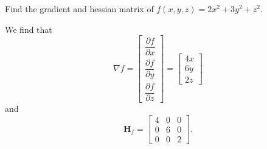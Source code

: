 \begin{example}
    Find the gradient and hessian matrix of $f(x,y,z) = 2x^2+3y^2+z^2$.
\end{example}
\begin{soln}
    We find that $$\nabla f = \begin{bmatrix} \dfrac{\partial f}{\partial x} \\[2.2ex] {\dfrac{\partial f}{\partial y}} \\[2.2ex]{\dfrac{\partial f}{\partial z}} \end{bmatrix} = \begin{bmatrix} 4x \\ 6y \\ 2z \end{bmatrix}$$ and
    $$\mathbf{H}_f = \begin{bmatrix} 4 & 0 & 0 \\ 0 & 6 & 0 \\ 0 & 0 & 2 \end{bmatrix}.$$
\end{soln}

